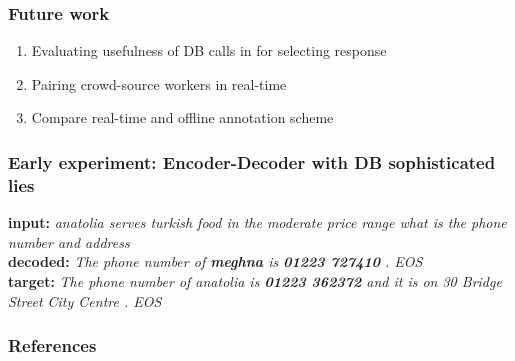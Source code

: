 \documentclass[10pt, compress,british,xcolor={svgnames,dvipsnames,x11names},trans]{beamer}
\begin{document}
\begin{frame}\frametitle{Future work}
    \begin{enumerate}
        \item Evaluating usefulness of DB calls in for selecting response 
        \item Pairing crowd-source workers in real-time
        \item Compare real-time and offline annotation scheme
    \end{enumerate}
\end{frame}

\appendix

\begin{frame} \frametitle{Early experiment: Encoder-Decoder with DB sophisticated lies}
{\bf input:} {\it anatolia serves turkish food in the moderate price range what is the phone number and address} \\
{\bf decoded:} {\it The phone number of {\bf meghna} is {\bf 01223 727410} . EOS} \\
{\bf target:} {\it The phone number of anatolia is {\bf 01223 362372} and it is on 30 Bridge Street City Centre . EOS}
\end{frame}

\begin{frame}[allowframebreaks]
        \frametitle{References}
        
        
\end{frame}
\end{document}
